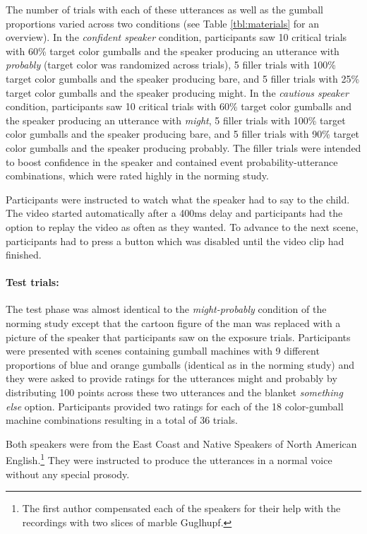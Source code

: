 \documentclass[lucida,biblatex]{sp} %
\begin{document}
The number of trials with each of these utterances as well as the gumball proportions varied across two conditions (see Table \ref{tbl:materials} for an overview). In the {\it confident speaker} condition, participants saw 10 critical trials with 60\% target color gumballs and the speaker producing an utterance with \emph{probably} (target color was randomized across trials), 5 filler trials with 100\% target color gumballs and the speaker producing {\sc bare}, and 5 filler trials with 25\% target color gumballs and the speaker producing {\sc might}. In the {\it cautious speaker} condition, participants saw 10 critical trials with 60\% target color gumballs and the speaker producing an utterance with \emph{might}, 5 filler trials with 100\% target color gumballs and the speaker producing {\sc bare}, and 5 filler trials with 90\% target color gumballs and the speaker producing {\sc probably}. The filler trials were intended to boost confidence in the speaker and contained event probability-utterance combinations, which were rated highly in the norming study. 

Participants were instructed to watch what the speaker had to say to the child. The video started automatically after a 400ms delay and participants had the option to replay the video as often as they wanted. To advance to the next scene, participants had to press a button which was disabled until the video clip had finished.

\paragraph{Test trials:} The test phase was almost identical to the  \textit{might-probably} condition of the norming study except that the cartoon figure of the man was replaced with a picture of the speaker that participants saw on the exposure trials. Participants were presented with scenes containing gumball machines with 9 different proportions of blue and orange gumballs  (identical as in the norming study) and they were asked to provide ratings for the utterances {\sc might} and {\sc probably} by distributing 100 points across these two utterances and the blanket {\it something else} option. Participants provided two ratings for each of the 18 color-gumball machine combinations resulting in a total of 36 trials. 

Both speakers were from the East Coast and Native Speakers of North American English.\footnote{The first author compensated each of the speakers for their help with the recordings with two slices of marble Guglhupf.} They were instructed to produce the utterances in a normal voice without any special prosody.
\end{document}
